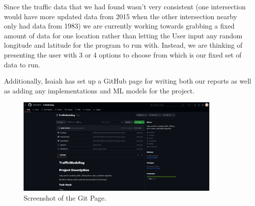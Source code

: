 \begin{flushleft}
Since the traffic data that we had found wasn't very consistent (one intersection would have more updated data from 2015 when the other intersection nearby only had data from 1983) we are currently working towards grabbing a fixed amount of data for one location rather than letting the User input any random longitude and latitude for the program to run with. Instead, we are thinking of presenting the user with 3 or 4 options to choose from which is our fixed set of data to run. \par

Additionally, Isaiah has set up a GitHub page for writing both our reports as well as adding any implementations and ML models for the project.
\end{flushleft}


\begin{figure}[htb]
    \centering
    \includegraphics[width=10cm]{../Images/GitPage.png}
       \caption{Screenshot of the Git Page.}
           \label{Fig:GitPage}
  \end{figure}